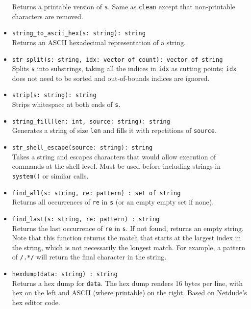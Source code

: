 \documentclass[10pt,landscape]{article}
\begin{document}
\begin{multicols*}{2}
\begin{itemize}
    Returns a printable version of \texttt{s}. Same as \texttt{clean} except
    that non-printable characters are removed.
  \item \verb|string_to_ascii_hex(s: string): string|\\
    Returns an ASCII hexadecimal representation of a string.
  \item \verb|str_split(s: string, idx: vector of count): vector of string|\\
    Splits \texttt{s} into substrings, taking all the indices in
    \texttt{idx} as cutting points; \texttt{idx} does not need to be sorted and
    out-of-bounds indices are ignored.
  \item \verb|strip(s: string): string|\\
    Strips whitespace at both ends of \texttt{s}.
  \item \verb|string_fill(len: int, source: string): string|\\
    Generates a string of size \texttt{len} and fills it with repetitions of
    \texttt{source}.
  \item \verb|str_shell_escape(source: string): string|\\
    Takes a string and escapes characters that would allow execution of
    commands at the shell level. Must be used before including strings in
    \texttt{system()} or similar calls.
  \item \verb|find_all(s: string, re: pattern) : set of string|\\
    Returns all occurrences of \texttt{re} in \texttt{s} (or an empty empty set
    if none).
  \item \verb|find_last(s: string, re: pattern) : string|\\
    Returns the last occurrence of \texttt{re} in \texttt{s}. If not found,
    returns an empty string.  Note that this function returns the match that
    starts at the largest index in the string, which is not necessarily the
    longest match.  For example, a pattern of \texttt{/.*/} will return the
    final character in the string.
  \item \verb|hexdump(data: string) : string|\\
    Returns a hex dump for \texttt{data}. The hex dump renders 16 bytes per
    line, with hex on the left and ASCII (where printable) on the right. Based
    on Netdude's hex editor code.
\end{itemize}

\end{multicols*}
\end{document}
